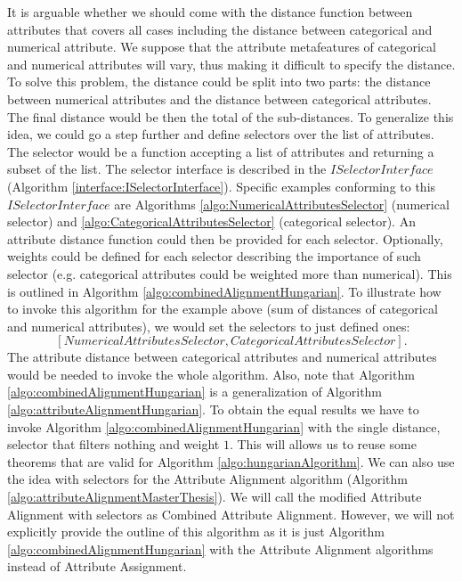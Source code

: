 It is arguable whether we should come with the distance function between attributes that covers all cases including the distance between categorical and numerical attribute. We suppose that the attribute metafeatures of categorical and numerical attributes will vary, thus making it difficult to specify the distance. To solve this problem, the distance could be split into two parts: the distance between numerical attributes and the distance between categorical attributes. The final distance would be then the total of the sub-distances. To generalize this idea, we could go a step further and define selectors over the list of attributes. The selector would be a function accepting a list of attributes and returning a subset of the list. The selector interface is described in the $ISelectorInterface$ (Algorithm \ref{interface:ISelectorInterface}). Specific examples conforming to this $ISelectorInterface$ are Algorithms \ref{algo:NumericalAttributesSelector} (numerical selector) and \ref{algo:CategoricalAttributesSelector} (categorical selector). An attribute distance function could then be provided for each selector. Optionally, weights could be defined for each selector describing the importance of such selector (e.g. categorical attributes could be weighted more than numerical). This is outlined in Algorithm \ref{algo:combinedAlignmentHungarian}. To illustrate how to invoke this algorithm for the example above (sum of distances of categorical and numerical attributes), we would set the selectors to just defined ones: $$[NumericalAttributesSelector, CategoricalAttributesSelector].$$ The attribute distance between categorical attributes and numerical attributes would be needed to invoke the whole algorithm. Also, note that Algorithm \ref{algo:combinedAlignmentHungarian} is a generalization of Algorithm \ref{algo:attributeAlignmentHungarian}. To obtain the equal results we have to invoke Algorithm \ref{algo:combinedAlignmentHungarian} with the single distance, selector that filters nothing and weight $1$. This will allows us to reuse some theorems that are valid for Algorithm \ref{algo:hungarianAlgorithm}. We can also use the idea with selectors for the Attribute Alignment algorithm (Algorithm \ref{algo:attributeAlignmentMasterThesis}). We will call the modified Attribute Alignment with selectors as Combined Attribute Alignment. However, we will not explicitly provide the outline of this algorithm as it is just Algorithm \ref{algo:combinedAlignmentHungarian} with the Attribute Alignment algorithms instead of Attribute Assignment.

